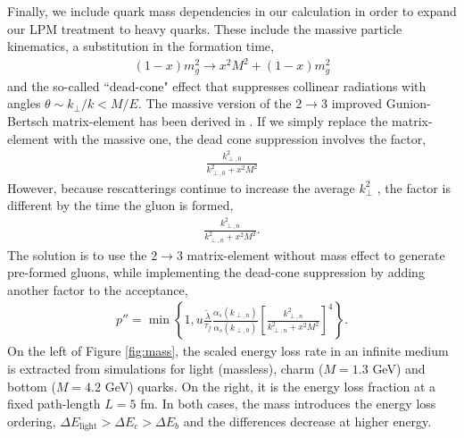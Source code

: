 \documentclass[aps, prc, reprint, amsmath, groupedaddress, nofootinbib]{revtex4-1}
\begin{document}
Finally, we include quark mass dependencies in our calculation in order to expand our LPM treatment to heavy quarks. These include the massive particle kinematics, a substitution in the formation time,
\begin{eqnarray}
(1-x)m_g^2 \rightarrow x^2M^2 + (1-x)m_g^2
\end{eqnarray}
and the so-called ``dead-cone" effect that suppresses collinear radiations with angles $\theta \sim k_\perp/k < M/E$. 
The massive version of the $2\rightarrow3$ improved Gunion-Bertsch matrix-element has been derived in \cite{Uphoff:2014hza}.
If we simply replace the matrix-element with the massive one, the dead cone suppression involves the factor,
\begin{eqnarray}
\frac{k_{\perp,0}^2}{k_{\perp,0}^2+x^2M^2}
\end{eqnarray}
However, because rescatterings continue to increase the average $k_{\perp}^2$ , the factor is different by the time the gluon is formed,
\begin{eqnarray}
\frac{k_{\perp,n}^2}{k_{\perp,n}^2+x^2M^2}.
\end{eqnarray}
The solution is to use the $2\rightarrow3$ matrix-element without mass effect to generate pre-formed gluons, while implementing the dead-cone suppression by adding another factor to the acceptance,
\begin{eqnarray}
p'' = \min\left\{1, u\frac{\tilde{\lambda}}{\tau_f}\frac{\alpha_s(k_{\perp,n})}{\alpha_s(k_{\perp,0})} \left[\frac{k_{\perp,n}^2}{k_{\perp,n}^2+x^2 M^2}\right]^4\right\}.
\end{eqnarray}
On the left of Figure \ref{fig:mass}, the scaled energy loss rate in an infinite medium is extracted from simulations for light (massless), charm ($M=1.3$ GeV) and bottom ($M=4.2$ GeV) quarks. 
On the right, it is the energy loss fraction at a fixed path-length $L=5$ fm.
In both cases, the mass introduces the energy loss ordering, $\Delta E_{\textrm{light}} > \Delta E_c > \Delta E_b$ and the differences decrease at higher energy.

\end{document}
